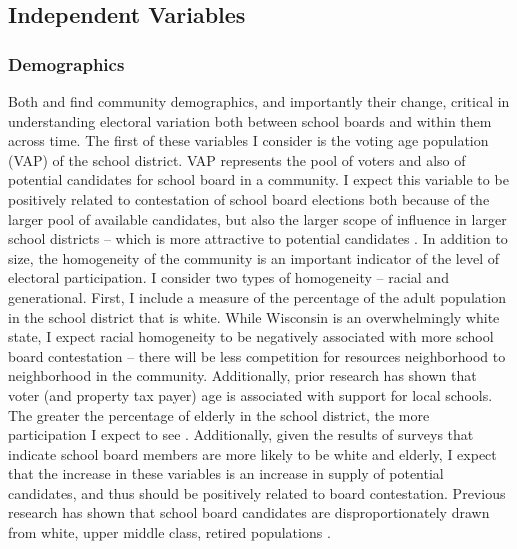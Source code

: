\clearpage

\subsection{Independent Variables}

\subsubsection{Demographics}
Both \citet{oliver} and \citet{RefWorks:297} find community demographics, and 
importantly their change, critical in understanding electoral variation both 
between school boards and within them across time. The first of these variables 
I consider is the voting age population (VAP) of 
the school district. VAP represents the pool of voters and also of potential 
candidates for school board in a community. I expect this variable to be 
positively related to contestation of school board elections both because of the 
larger pool of available candidates, but also the larger scope of influence in 
larger school districts -- which is more attractive to potential candidates 
\citep{oliver}. In addition to size, the homogeneity of the community is an 
important indicator of the level of electoral participation. I consider two types 
of homogeneity -- racial and generational. First, I include a measure of the 
percentage of the adult population in the school district that is white. While 
Wisconsin is an overwhelmingly white state, I expect racial homogeneity to be 
negatively associated with more school board contestation -- there will be less 
competition for resources neighborhood to neighborhood in the community. Additionally, 
prior research has shown that voter (and property tax payer) age is associated with 
support for local schools. The greater the percentage of elderly in the school 
district, the more participation I expect to see \citep{RefWorks:332}. 
Additionally, given the results of surveys that indicate school board members 
are more likely to be white and elderly, I expect that the increase in these 
variables is an increase in supply of potential candidates, and thus should be 
positively related to board contestation. Previous research has shown that school 
board candidates are disproportionately drawn from white, upper middle class, retired 
populations \citep{RefWorks:321, RefWorks:322, RefWorks:333}. 

